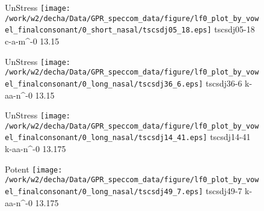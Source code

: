 \documentclass{article}
\begin{document}
\begin{figure}[t]
\begin{minipage}[b]{.24\textwidth}
UnStress
\centering
\texttt{[image: /work/w2/decha/Data/GPR\_speccom\_data/figure/lf0\_plot\_by\_vowel\_finalconsonant/0\_short\_nasal/tscsdj05\_18.eps]}
tscsdj05-18 c-a-m\textasciicircum-0 13.15
\end{minipage}
\begin{minipage}[b]{.24\textwidth}
UnStress
\centering
\texttt{[image: /work/w2/decha/Data/GPR\_speccom\_data/figure/lf0\_plot\_by\_vowel\_finalconsonant/0\_long\_nasal/tscsdj36\_6.eps]}
tscsdj36-6 k-aa-n\textasciicircum-0 13.15
\end{minipage}
\begin{minipage}[b]{.24\textwidth}
UnStress
\centering
\texttt{[image: /work/w2/decha/Data/GPR\_speccom\_data/figure/lf0\_plot\_by\_vowel\_finalconsonant/0\_long\_nasal/tscsdj14\_41.eps]}
tscsdj14-41 k-aa-n\textasciicircum-0 13.175
\end{minipage}
\begin{minipage}[b]{.24\textwidth}
\colorbox{Apricot}{Potent}
\centering
\texttt{[image: /work/w2/decha/Data/GPR\_speccom\_data/figure/lf0\_plot\_by\_vowel\_finalconsonant/0\_long\_nasal/tscsdj49\_7.eps]}
tscsdj49-7 k-aa-n\textasciicircum-0 13.175
\end{minipage}
\end{figure}
\end{document}
